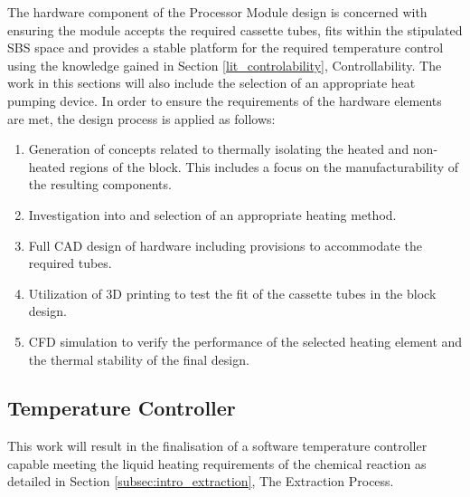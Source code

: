 The hardware component of the Processor Module design is concerned with ensuring the module accepts the required cassette tubes, fits within the stipulated SBS space and provides a stable platform for the required temperature control using the knowledge gained in Section \ref{lit_controlability}, Controllability. The work in this sections will also include the selection of an appropriate heat pumping device. In order to ensure the requirements of the hardware elements are met, the design process is applied as follows:
\begin{enumerate}
	\item Generation of concepts related to thermally isolating the heated and non-heated regions of the block. This includes a focus on the manufacturability of the resulting components.
	\item Investigation into and selection of an appropriate heating method.
	\item Full CAD design of hardware including provisions to accommodate the required tubes.
	\item Utilization of 3D printing to test the fit of the cassette tubes in the block design.
	\item CFD simulation to verify the performance of the selected heating element and the thermal stability of the final design. 
\end{enumerate}

\subsection{Temperature Controller}

This work will result in the finalisation of a software temperature controller capable meeting the liquid heating requirements of the chemical reaction as detailed in Section \ref{subsec:intro_extraction}, The Extraction Process.

